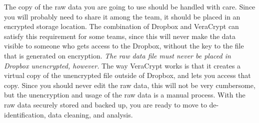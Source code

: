 The copy of the raw data you are going to use
should be handled with care.
Since you will probably need to share it among the team,
it should be placed in an encrypted storage location.
The combination of Dropbox and VeraCrypt
can satisfy this requirement for some teams,
since this will never make the data visible to someone
who gets access to the Dropbox,
without the key to the file that is generated on encryption.
\textit{The raw data file must never be placed in Dropbox unencrypted, however.}
The way VeraCrypt works is that it creates a virtual copy
of the unencrypted file outside of Dropbox, and lets you access that copy.
Since you should never edit the raw data, this will not be very cumbersome,
but the unencryption and usage of the raw data is a manual process.
With the raw data securely stored and backed up,
you are ready to move to de-identification, data cleaning, and analysis.
